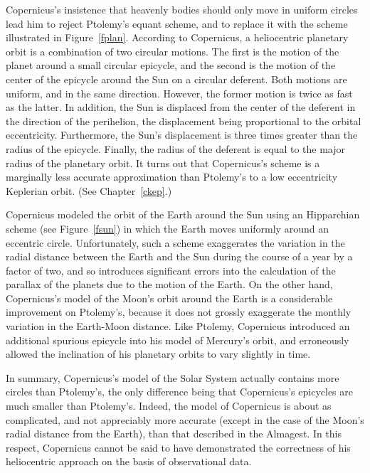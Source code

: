 Copernicus's insistence that heavenly bodies should only move in uniform 
circles lead him to reject Ptolemy's  equant scheme, and to  replace
it with the scheme illustrated in Figure~\ref{fplan}. According to Copernicus, a heliocentric
planetary orbit is a combination of  two  circular motions. The first is 
the motion of the planet around a small circular epicycle, and the second is the motion of the center of
the epicycle around the Sun on  a circular deferent. Both motions are  uniform, and in the same direction.
However, the former motion is twice as fast as the latter. In addition, the Sun is displaced
from the center of the deferent in the direction of the perihelion, the displacement being
proportional to the orbital eccentricity. Furthermore, the Sun's displacement
is  three  times greater than the radius of the epicycle. Finally, the
radius of the deferent is equal to the major radius of the planetary orbit. It turns
out that Copernicus's scheme is a marginally less accurate approximation  than Ptolemy's to 
a low eccentricity Keplerian orbit. (See Chapter~\ref{ckep}.) 

Copernicus modeled the
orbit of the Earth around the Sun using an Hipparchian scheme (see Figure~\ref{fsun}) in which the Earth moves
uniformly around an eccentric circle.  Unfortunately, such a scheme exaggerates the variation in the
radial distance between the Earth and the Sun during the course of a year by a factor of two, and so
introduces significant errors into the calculation of the parallax of the planets due to the motion of the Earth. 
On the other hand, Copernicus's model of the Moon's orbit around the Earth is a considerable improvement on Ptolemy's, because
it does not grossly exaggerate the monthly variation in the Earth-Moon distance. 
Like Ptolemy, Copernicus  introduced an additional spurious epicycle into his model
of Mercury's orbit, and erroneously allowed the
inclination of his planetary orbits to vary slightly  in time. 

In summary, Copernicus's model of the Solar System actually contains  more  circles than Ptolemy's, the only difference being that Copernicus's epicycles are much 
 smaller than Ptolemy's.  Indeed, the model of Copernicus is about as complicated, and not appreciably more accurate (except in the case of the Moon's radial
 distance from the Earth), than that described in the  Almagest. 
In this respect, Copernicus cannot be said to have demonstrated
the correctness of his heliocentric approach on the basis of observational data. 

